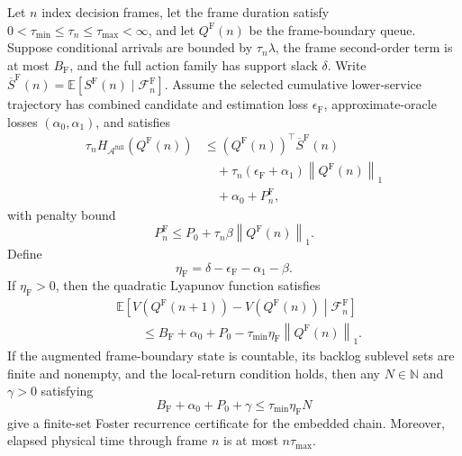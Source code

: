 \documentclass[opre,dblanonrev]{informs4}
\newcommand{\Afull}{\mathcal A^{\mathrm{full}}}
\newcommand{\E}{\mathbb E}
\newcommand{\normone}[1]{\left\|#1\right\|_1}
\begin{document}
\begin{proposition}
\label{prop:frame-drift}
Let \(n\) index decision frames, let the frame duration satisfy
\(0<\tau_{\min}\leq\tau_n\leq\tau_{\max}<\infty\), and let
\(Q^{\mathrm F}(n)\) be the frame-boundary queue.  Suppose conditional arrivals
are bounded by \(\tau_n\lambda\), the frame second-order term is at most
\(B_{\mathrm F}\), and the full action family has support slack \(\delta\).
Write
\(\overline S^{\mathrm F}(n)=
\E[S^{\mathrm F}(n)\mid\mathcal F_n^{\mathrm F}]\).
Assume the selected cumulative lower-service trajectory has combined candidate
and estimation loss \(\epsilon_{\mathrm F}\), approximate-oracle losses
\((\alpha_0,\alpha_1)\), and satisfies
\begin{equation}
  \begin{aligned}
  \tau_n H_{\Afull}\!\left(Q^{\mathrm F}(n)\right)
  &\leq \left(Q^{\mathrm F}(n)\right)^{\!\top}
    \overline S^{\mathrm F}(n)\\
  &\quad+\tau_n(\epsilon_{\mathrm F}+\alpha_1)
    \normone{Q^{\mathrm F}(n)}\\
  &\quad+\alpha_0+P_n^{\mathrm F},
  \end{aligned}
  \label{eq:main-frame-oracle}
\end{equation}
with penalty bound
\[
  P_n^{\mathrm F}
  \leq P_0+\tau_n\beta\normone{Q^{\mathrm F}(n)}.
\]
Define
\begin{equation}
  \eta_{\mathrm F}
  =\delta-\epsilon_{\mathrm F}-\alpha_1-\beta.
  \label{eq:main-frame-margin}
\end{equation}
If \(\eta_{\mathrm F}>0\), then the quadratic Lyapunov function satisfies
\begin{equation}
  \begin{aligned}
  &\E\!\left[
    V\!\left(Q^{\mathrm F}(n+1)\right)
    -V\!\left(Q^{\mathrm F}(n)\right)
    \middle|\mathcal F_n^{\mathrm F}
  \right]\\
  &\qquad\leq B_{\mathrm F}+\alpha_0+P_0
  -\tau_{\min}\eta_{\mathrm F}\normone{Q^{\mathrm F}(n)}.
  \end{aligned}
  \label{eq:main-frame-drift}
\end{equation}
If the augmented frame-boundary state is countable, its backlog sublevel sets
are finite and nonempty, and the local-return condition holds, then any
\(N\in\mathbb N\) and \(\gamma>0\) satisfying
\begin{equation}
  B_{\mathrm F}+\alpha_0+P_0+\gamma
  \leq\tau_{\min}\eta_{\mathrm F}N
  \label{eq:main-frame-threshold}
\end{equation}
give a finite-set Foster recurrence certificate for the embedded chain.
Moreover, elapsed physical time through frame \(n\) is at most
\(n\tau_{\max}\).
\end{proposition}
\end{document}

